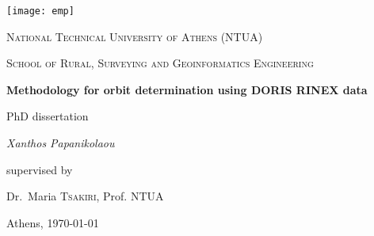 \begin{titlepage}
  \centering
  \texttt{[image: emp]}\par\vspace{1cm}
  {\Large \textsc{National Technical University of Athens (NTUA)} \par}
  {\Large \textsc{School of Rural, Surveying and Geoinformatics Engineering} \par}
  \vspace{.5cm}
  {\huge\bfseries Methodology for orbit determination using DORIS RINEX data \par}
  \vspace{2cm}
  {\large PhD dissertation}\\
  \vspace{.15cm}
  {\Large\itshape Xanthos Papanikolaou\par}
  \vfill
  supervised by\par
  Dr.~Maria \textsc{Tsakiri}, Prof. NTUA
  \vfill
  {\large Athens, \today\par}
\end{titlepage}
\thispagestyle{empty}
